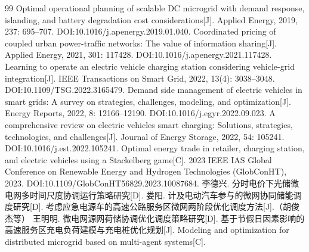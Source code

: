 \documentclass[UTF8,a4paper,11pt]{ctexart}
\begin{document}
\begin{thebibliography}{99}
 Optimal operational planning of scalable DC microgrid with demand response, islanding, and battery degradation cost considerations[J]. Applied Energy, 2019, 237: 695--707. DOI:10.1016/j.apenergy.2019.01.040.
 Coordinated pricing of coupled urban power-traffic networks: The value of information sharing[J]. Applied Energy, 2021, 301: 117428. DOI:10.1016/j.apenergy.2021.117428.
 Learning to operate an electric vehicle charging station considering vehicle-grid integration[J]. IEEE Transactions on Smart Grid, 2022, 13(4): 3038--3048. DOI:10.1109/TSG.2022.3165479.
 Demand side management of electric vehicles in smart grids: A survey on strategies, challenges, modeling, and optimization[J]. Energy Reports, 2022, 8: 12166--12190. DOI:10.1016/j.egyr.2022.09.023.
 A comprehensive review on electric vehicles smart charging: Solutions, strategies, technologies, and challenges[J]. Journal of Energy Storage, 2022, 54: 105241. DOI:10.1016/j.est.2022.105241.
 Optimal energy trade in retailer, charging station, and electric vehicles using a Stackelberg game[C]. 2023 IEEE IAS Global Conference on Renewable Energy and Hydrogen Technologies (GlobConHT), 2023. DOI:10.1109/GlobConHT56829.2023.10087684.
 李德兴. 分时电价下光储微电网多时间尺度协调运行策略研究[D].
 娄阳. 计及电动汽车参与的微网协同储能调度研究[D].
 考虑应急电源车的高速公路服务区微网两阶段优化调度方法[J].（胡俊杰等）
 王明明. 微电网源网荷储协调优化调度策略研究[D].
 基于节假日因素影响的高速服务区充电负荷建模与充电桩优化规划[J].
 Modeling and optimization for distributed microgrid based on multi-agent systems[C].
\end{thebibliography}
\end{document}
